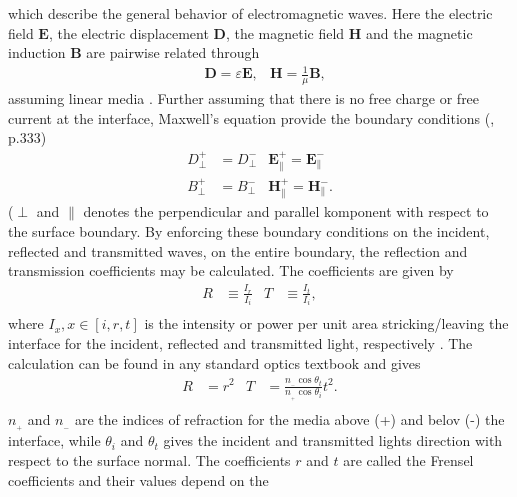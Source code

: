 %
which describe the general behavior of electromagnetic waves.
Here the electric field $\boldsymbol{E}$, the electric displacement $\boldsymbol{D}$,
the magnetic field $\boldsymbol{H}$ and the magnetic induction $\boldsymbol{B}$
are pairwise related through
\begin{align}
   \label{linearConstitutiveRelations}
   &\boldsymbol{D} = \varepsilon \boldsymbol{E},         &\boldsymbol{H} = \frac{1}{\mu} \boldsymbol{B},
\end{align}
assuming linear media \cite[p.~330]{Griffiths}. 
Further assuming that there
is no free charge or free current at the interface, Maxwell's equation provide the boundary conditions 
(\cite{Griffiths}, p.333)
%
\begin{subequations}
\label{BC}
\begin{align}
   D^+_{\perp} &= D^-_{\perp}      &\boldsymbol{E}^+_{\parallel} = \boldsymbol{E}^-_{\parallel} \label{BC1}\\
   B^+_{\perp} &= B^-_{\perp}      &\boldsymbol{H}^+_{\parallel} = \boldsymbol{H}^-_{\parallel}. \label{BC2}
\end{align}
\end{subequations}
%
($\perp$ and $\parallel$ denotes the perpendicular and parallel komponent with respect to the 
surface boundary. By enforcing these boundary conditions on the incident, reflected and transmitted 
waves, on the entire boundary, the reflection and transmission coefficients may be calculated. The 
coefficients are given by
\begin{align}
   R &\equiv \frac{I_r}{I_i}     &T &\equiv \frac{I_t}{I_i}, \label{refTransCoeffs1}\\
\end{align}
where $I_x, x \in [i,r,t]$ is the intensity or power per unit area stricking/leaving the interface
for the incident, reflected and transmitted light, respectively \cite[p.~386-391]{Griffiths}.
The calculation can be found in any standard optics textbook \cite{Smith} and gives
\begin{align}
   R &= r^2       &T &= \frac{n\!_{_-} \cos \theta_t}{n\!_{_+} \cos \theta _i}t^2. \label{refTransCoeffs2}\\
\end{align}
$n\!_{_+}$ and $n\!_{_-}$ are the indices of refraction for the media above (+) and belov (-) the interface,
while $\theta_i$ and $\theta_t$ gives the incident and transmitted lights direction with respect to the 
surface normal. 
The coefficients $r$ and $t$ are called the Frensel coefficients and their values depend on the

